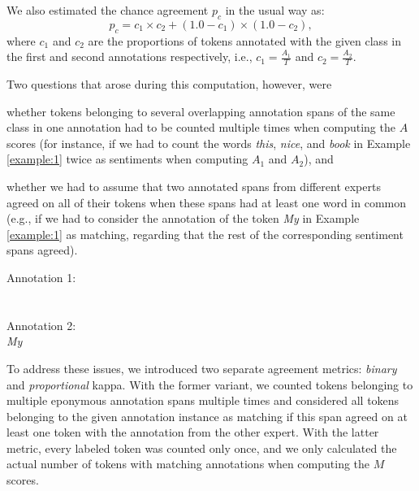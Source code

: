 We also estimated the chance agreement $p_c$ in the usual way as:
\begin{equation*}\textstyle
  p_c = c_1 \times c_2 + (1.0 - c_1) \times (1.0 - c_2),
\end{equation*}
where $c_1$ and $c_2$ are the proportions of tokens annotated with the
given class in the first and second annotations respectively, i.e.,
$c_1 = \frac{A_1}{T}$ and $c_2 = \frac{A_2}{T}$.

Two questions that arose during this computation, however, were
\begin{inparaenum}
  \item whether tokens belonging to several overlapping annotation
    spans of the same class in one annotation had to be counted
    multiple times when computing the $A$ scores (for instance, if we
    had to count the words \textit{this}, \textit{nice}, and
    \textit{book} in Example \ref{example:1} twice as sentiments when
    computing $A_1$ and $A_2$), and
  \item whether we had to assume that two annotated spans from
    different experts agreed on all of their tokens when these spans
    had at least one word in common (e.g., if we had to consider the
    annotation of the token \textit{My} in Example \ref{example:1} as
    matching, regarding that the rest of the corresponding sentiment
    spans agreed).
\end{inparaenum}

{
\renewcommand{\thesection}{\arabic{section}}
\begin{example}\label{example:1}
\upshape \textup{Annotation 1:}\\\\\\ \textup{Annotation 2:}\\\itshape My\upshape
{}
\end{example}
}

To address these issues, we introduced two separate agreement metrics:
\emph{binary} and \emph{proportional} kappa.  With the former variant,
we counted tokens belonging to multiple eponymous annotation spans
multiple times and considered all tokens belonging to the given
annotation instance as matching if this span agreed on at least one
token with the annotation from the other expert.  With the latter
metric, every labeled token was counted only once, and we only
calculated the actual number of tokens with matching annotations when
computing the $M$ scores.


